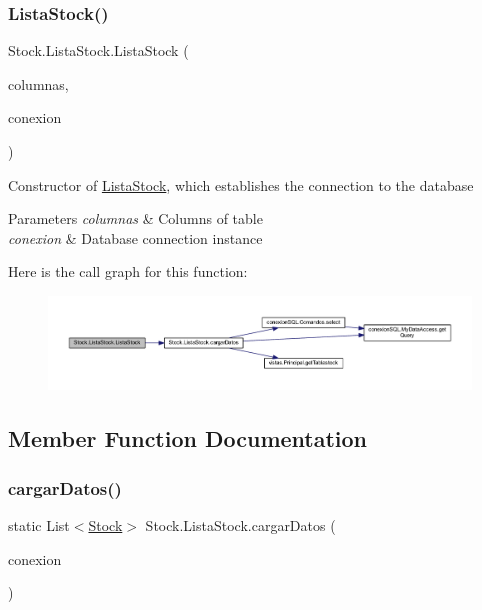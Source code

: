 \subsubsection{\texorpdfstring{Lista\+Stock()}{ListaStock()}}
{\footnotesize\ttfamily Stock.\+Lista\+Stock.\+Lista\+Stock (\begin{DoxyParamCaption}\item[{\mbox{\hyperlink{class_stock_1_1_modelo_columnas_tabla_stock}{Modelo\+Columnas\+Tabla\+Stock}}}]{columnas,  }\item[{\mbox{\hyperlink{classconexion_s_q_l_1_1_my_data_access}{My\+Data\+Access}}}]{conexion }\end{DoxyParamCaption})}

Constructor of \mbox{\hyperlink{class_stock_1_1_lista_stock}{Lista\+Stock}}, which establishes the connection to the database 
\begin{DoxyParams}{Parameters}
{\em columnas} & Columns of table \\
\hline
{\em conexion} & Database connection instance \\
\hline
\end{DoxyParams}
Here is the call graph for this function\+:
\nopagebreak
\begin{figure}[H]
\begin{center}
\leavevmode
\includegraphics[width=350pt]{class_stock_1_1_lista_stock_a21df0fe48a39fb1aac80a2ca7fb67c0a_cgraph}
\end{center}
\end{figure}


\subsection{Member Function Documentation}
\mbox{\label{class_stock_1_1_lista_stock_ae43d6e1304e10935ed275f770f6fd743}} 
\subsubsection{\texorpdfstring{cargar\+Datos()}{cargarDatos()}}
{\footnotesize\ttfamily static List$<$\mbox{\hyperlink{class_stock_1_1_stock}{Stock}}$>$ Stock.\+Lista\+Stock.\+cargar\+Datos (\begin{DoxyParamCaption}\item[{\mbox{\hyperlink{classconexion_s_q_l_1_1_my_data_access}{My\+Data\+Access}}}]{conexion }\end{DoxyParamCaption})\hspace{0.3cm}{\ttfamily [static]}}

